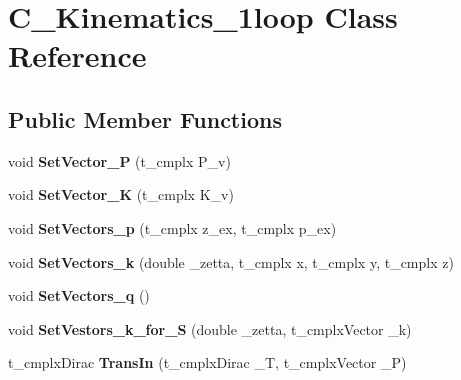 \hypertarget{class_c___kinematics__1loop}{\section{C\-\_\-\-Kinematics\-\_\-1loop Class Reference}
\label{class_c___kinematics__1loop}
}
\subsection*{Public Member Functions}
\begin{DoxyCompactItemize}
\item 
\hypertarget{class_c___kinematics__1loop_ac8ea5c0bc49a996a39f5d9bb9be77938}{void {\bfseries Set\-Vector\-\_\-\-P} (t\-\_\-cmplx P\-\_\-v)}\label{class_c___kinematics__1loop_ac8ea5c0bc49a996a39f5d9bb9be77938}

\item 
\hypertarget{class_c___kinematics__1loop_a19d01bd7b6d4823e432fe4b6e93bb5cb}{void {\bfseries Set\-Vector\-\_\-\-K} (t\-\_\-cmplx K\-\_\-v)}\label{class_c___kinematics__1loop_a19d01bd7b6d4823e432fe4b6e93bb5cb}

\item 
\hypertarget{class_c___kinematics__1loop_af2e051a57be7c9f8b4f82c9c8075f66f}{void {\bfseries Set\-Vectors\-\_\-p} (t\-\_\-cmplx z\-\_\-ex, t\-\_\-cmplx p\-\_\-ex)}\label{class_c___kinematics__1loop_af2e051a57be7c9f8b4f82c9c8075f66f}

\item 
\hypertarget{class_c___kinematics__1loop_a5f1fac5360637bd87b4cf4cf29577e41}{void {\bfseries Set\-Vectors\-\_\-k} (double \-\_\-zetta, t\-\_\-cmplx x, t\-\_\-cmplx y, t\-\_\-cmplx z)}\label{class_c___kinematics__1loop_a5f1fac5360637bd87b4cf4cf29577e41}

\item 
\hypertarget{class_c___kinematics__1loop_aa93f0b39da69100d1801a9d525b65fff}{void {\bfseries Set\-Vectors\-\_\-q} ()}\label{class_c___kinematics__1loop_aa93f0b39da69100d1801a9d525b65fff}

\item 
\hypertarget{class_c___kinematics__1loop_a9d78b3129c3eefedb197f1fd13c341e7}{void {\bfseries Set\-Vestors\-\_\-k\-\_\-for\-\_\-\-S} (double \-\_\-zetta, t\-\_\-cmplx\-Vector \-\_\-k)}\label{class_c___kinematics__1loop_a9d78b3129c3eefedb197f1fd13c341e7}

\item 
\hypertarget{class_c___kinematics__1loop_a9ea61128f7fc8f0c43ba3a7ca649059f}{t\-\_\-cmplx\-Dirac {\bfseries Trans\-In} (t\-\_\-cmplx\-Dirac \-\_\-\-T, t\-\_\-cmplx\-Vector \-\_\-\-P)}\label{class_c___kinematics__1loop_a9ea61128f7fc8f0c43ba3a7ca649059f}


\end{DoxyCompactItemize}

